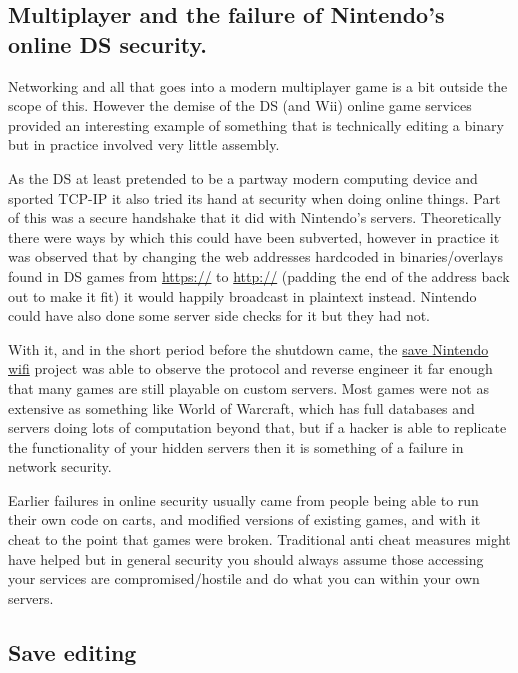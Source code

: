 \documentclass[
]{book}
\begin{document}
\hypertarget{multiplayer-and-the-failure-of-nintendos-online-ds-security.}{%
\subsection{Multiplayer and the failure of Nintendo's online DS security.}\label{multiplayer-and-the-failure-of-nintendos-online-ds-security.}}

Networking and all that goes into a modern multiplayer game is a bit outside the scope of this. However the demise of the DS (and Wii) online game services provided an interesting example of something that is technically editing a binary but in practice involved very little assembly.

As the DS at least pretended to be a partway modern computing device and sported TCP-IP it also tried its hand at security when doing online things. Part of this was a secure handshake that it did with Nintendo's servers. Theoretically there were ways by which this could have been subverted, however in practice it was observed that by changing the web addresses hardcoded in binaries/overlays found in DS games from \url{https://} to \url{http://} (padding the end of the address back out to make it fit) it would happily broadcast in plaintext instead. Nintendo could have also done some server side checks for it but they had not.

With it, and in the short period before the shutdown came, the \href{http://gbatemp.net/threads/save-nintendo-wifi-a-project-to-save-online-servers-for-ds-and-wii-games.362717/}{save Nintendo wifi} project was able to observe the protocol and reverse engineer it far enough that many games are still playable on custom servers. Most games were not as extensive as something like World of Warcraft, which has full databases and servers doing lots of computation beyond that, but if a hacker is able to replicate the functionality of your hidden servers then it is something of a failure in network security.

Earlier failures in online security usually came from people being able to run their own code on carts, and modified versions of existing games, and with it cheat to the point that games were broken. Traditional anti cheat measures might have helped but in general security you should always assume those accessing your services are compromised/hostile and do what you can within your own servers.

\hypertarget{save-editing}{%
\subsection{Save editing}\label{save-editing}}
\end{document}
